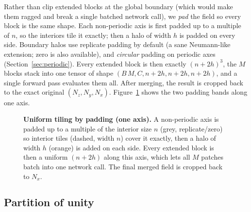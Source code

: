 \documentclass[11pt]{article}
\begin{document}
Rather than clip extended blocks at the global boundary (which would make them
ragged and break a single batched network call), we \emph{pad} the field so every
block is the same shape. Each non-periodic axis is first padded up to a multiple of
$n$, so the interiors tile it exactly; then a halo of width $h$ is padded on every
side. Boundary halos use replicate padding by default (a sane Neumann-like
extension; zero is also available), and \emph{circular} padding on periodic axes
(Section~\ref{sec:periodic}). Every extended block is then exactly $(n+2h)^3$, the
$M$ blocks stack into one tensor of shape $(B\,M,C,n+2h,n+2h,n+2h)$, and a single
forward pass evaluates them all. After merging, the result is cropped back to the
exact original $(N_z,N_y,N_x)$. Figure~\ref{fig:tiling} shows the two padding bands
along one axis.

\begin{figure}[t]
\centering
{}
\caption{\textbf{Uniform tiling by padding (one axis).} A non-periodic axis is
padded up to a multiple of the interior size $n$ (grey, replicate/zero) so interior
tiles (dashed, width $n$) cover it exactly, then a halo of width $h$ (orange) is
added on each side. Every extended block is then a uniform $(n+2h)$ along this axis,
which lets all $M$ patches batch into one network call. The final merged field is
cropped back to $N_x$.}
\label{fig:tiling}
\end{figure}

\subsection{Partition of unity}\label{sec:pou}
\end{document}
